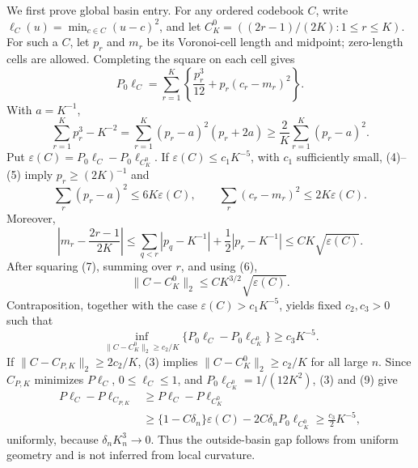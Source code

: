 We first prove global basin entry.  For any ordered codebook \(C\), write \(\ell_C(u)=\min_{c\in C}(u-c)^2\), and let \(C_K^0=((2r-1)/(2K):1\leq r\leq K)\).  For such a \(C\), let \(p_r\) and \(m_r\) be its Voronoi-cell length and midpoint; zero-length cells are allowed.  Completing the square on each cell gives
\[
 P_0\ell_C=\sum_{r=1}^K\left\{\frac{p_r^3}{12}+p_r(c_r-m_r)^2\right\}.       \tag{4}
\]
With \(a=K^{-1}\),
\[
 \sum_{r=1}^Kp_r^3-K^{-2}
 =\sum_{r=1}^K(p_r-a)^2(p_r+2a)
 \geq\frac2K\sum_{r=1}^K(p_r-a)^2.                                         \tag{5}
\]
Put \(\varepsilon(C)=P_0\ell_C-P_0\ell_{C_K^0}\).  If \(\varepsilon(C)\leq c_1K^{-5}\), with \(c_1\) sufficiently small, (4)--(5) imply \(p_r\geq(2K)^{-1}\) and
\[
 \sum_r(p_r-a)^2\leq6K\varepsilon(C),\qquad
 \sum_r(c_r-m_r)^2\leq2K\varepsilon(C).                                    \tag{6}
\]
Moreover,
\[
 \left|m_r-\frac{2r-1}{2K}\right|
 \leq\sum_{q<r}|p_q-K^{-1}|+\frac12|p_r-K^{-1}|
 \leq CK\sqrt{\varepsilon(C)}.                                              \tag{7}
\]
After squaring (7), summing over \(r\), and using (6),
\[
 \|C-C_K^0\|_2\leq CK^{3/2}\sqrt{\varepsilon(C)}.                           \tag{8}
\]
Contraposition, together with the case \(\varepsilon(C)>c_1K^{-5}\), yields fixed \(c_2,c_3>0\) such that
\[
 \inf_{\|C-C_K^0\|_2\geq c_2/K}
 \{P_0\ell_C-P_0\ell_{C_K^0}\}\geq c_3K^{-5}.                              \tag{9}
\]
If \(\|C-C_{P,K}\|_2\geq2c_2/K\), (3) implies \(\|C-C_K^0\|_2\geq c_2/K\) for all large \(n\).  Since \(C_{P,K}\) minimizes \(P\ell_C\), \(0\leq\ell_C\leq1\), and \(P_0\ell_{C_K^0}=1/(12K^2)\), (3) and (9) give
\[
\begin{aligned}
 P\ell_C-P\ell_{C_{P,K}}
 &\geq P\ell_C-P\ell_{C_K^0}\\
 &\geq \{1-C\delta_n\}\varepsilon(C)-2C\delta_nP_0\ell_{C_K^0}
 \geq \frac{c_3}{2}K^{-5},
\end{aligned}                                                               \tag{10}
\]
uniformly, because \(\delta_nK_n^3\to0\).  Thus the outside-basin gap follows from uniform geometry and is not inferred from local curvature.

